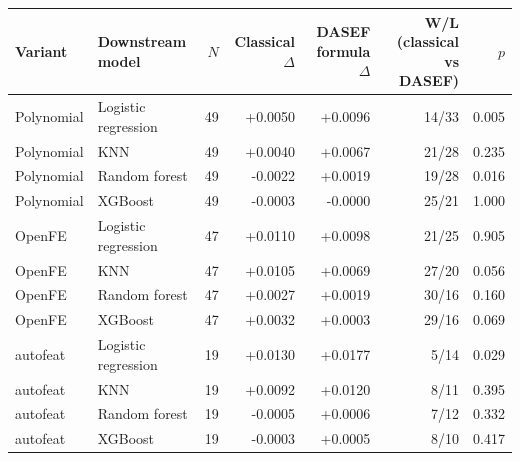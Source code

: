 \begin{tabular}{llrrrrr}
\toprule
Variant & Downstream model & $N$ & Classical $\Delta$ & DASEF formula $\Delta$ & W/L (classical vs DASEF) & $p$ \\
\midrule
Polynomial & Logistic regression & 49 & +0.0050 & +0.0096 & 14/33 & 0.005 \\
Polynomial & KNN & 49 & +0.0040 & +0.0067 & 21/28 & 0.235 \\
Polynomial & Random forest & 49 & -0.0022 & +0.0019 & 19/28 & 0.016 \\
Polynomial & XGBoost & 49 & -0.0003 & -0.0000 & 25/21 & 1.000 \\
OpenFE & Logistic regression & 47 & +0.0110 & +0.0098 & 21/25 & 0.905 \\
OpenFE & KNN & 47 & +0.0105 & +0.0069 & 27/20 & 0.056 \\
OpenFE & Random forest & 47 & +0.0027 & +0.0019 & 30/16 & 0.160 \\
OpenFE & XGBoost & 47 & +0.0032 & +0.0003 & 29/16 & 0.069 \\
autofeat & Logistic regression & 19 & +0.0130 & +0.0177 & 5/14 & 0.029 \\
autofeat & KNN & 19 & +0.0092 & +0.0120 & 8/11 & 0.395 \\
autofeat & Random forest & 19 & -0.0005 & +0.0006 & 7/12 & 0.332 \\
autofeat & XGBoost & 19 & -0.0003 & +0.0005 & 8/10 & 0.417 \\
\bottomrule
\end{tabular}
